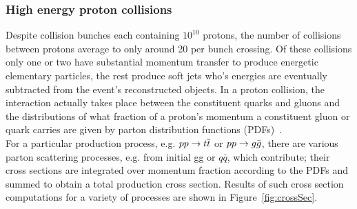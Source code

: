 \FloatBarrier
\subsubsection{High energy proton collisions}

Despite collision bunches each containing $10^{10}$ protons, the number of collisions
between protons average to only around 20 per bunch crossing. Of these collisions only
one or two have substantial momentum transfer to produce energetic elementary 
particles, the rest produce soft jets who's energies are eventually subtracted from the event's
reconstructed objects. In a proton collision, the interaction actually takes place between the 
constituent quarks and gluons and the distributions of what fraction of a proton's momentum a 
constituent gluon or quark carries are given by parton distribution functions (PDFs)~\cite{green2005high}. \\
\indent For a particular production process, e.g. $pp \rightarrow \relax{t}\overline{\relax{t}}$ or $pp \rightarrow g\bar{g}$, there are 
various parton scattering processes, e.g. from initial gg or $q\bar{q}$, which contribute; their cross sections 
are integrated over momentum fraction according to the PDFs and summed to obtain a total production cross section.
Results of such cross section computations for a variety of processes are shown
in Figure~\ref{fig:crossSec}.

